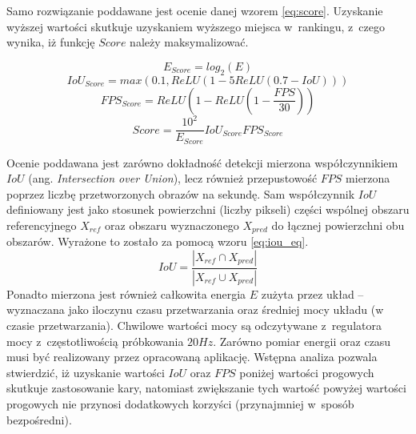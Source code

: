 Samo rozwiązanie poddawane jest ocenie danej wzorem \eqref{eq:score}. Uzyskanie wyższej wartości skutkuje uzyskaniem wyższego miejsca w~rankingu, z~czego wynika, iż funkcję $Score$ należy maksymalizować. 

\begin{equation}
E_{Score} = log_2(E)
\label{eq:e_score}
\end{equation}
\begin{equation}
IoU_{Score} = max(0.1, ReLU(1 - 5 ReLU(0.7 - IoU)))
\label{eq:iou_score}
\end{equation}
\begin{equation}
FPS_{Score} = ReLU(1 - ReLU( 1 - \frac{FPS}{30}))
\label{eq:fps_score}
\end{equation}
\begin{equation}
Score = \frac{10^2}{E_{Score}} IoU_{Score} FPS_{Score}
\label{eq:score}
\end{equation}

Ocenie poddawana jest zarówno dokładność detekcji mierzona współczynnikiem $IoU$ (ang. \emph{Intersection over Union}), lecz również przepustowość $FPS$ mierzona poprzez liczbę przetworzonych obrazów na sekundę.
Sam współczynnik $IoU$ definiowany jest jako stosunek powierzchni (liczby pikseli) części wspólnej obszaru referencyjnego $X_{ref}$ oraz obszaru wyznaczonego $X_{pred}$ do łącznej powierzchni obu obszarów. Wyrażone to zostało za pomocą wzoru \eqref{eq:iou_eq}.
\begin{equation}
IoU = \frac{|X_{ref} \cap X_{pred}|}{|X_{ref} \cup X_{pred}|}
\label{eq:iou_eq}
\end{equation}
Ponadto mierzona jest również całkowita energia $E$ zużyta przez układ -- wyznaczana jako iloczynu czasu przetwarzania oraz średniej mocy układu (w czasie przetwarzania). 
Chwilowe wartości mocy są odczytywane z~regulatora mocy z~częstotliwością próbkowania $20 Hz$.
Zarówno pomiar energii oraz czasu musi być realizowany przez opracowaną aplikację.
Wstępna analiza pozwala stwierdzić, iż uzyskanie wartości $IoU$ oraz $FPS$ poniżej wartości progowych skutkuje zastosowanie kary, natomiast
zwiększanie tych wartość powyżej wartości progowych nie przynosi dodatkowych korzyści (przynajmniej w~sposób bezpośredni). 


